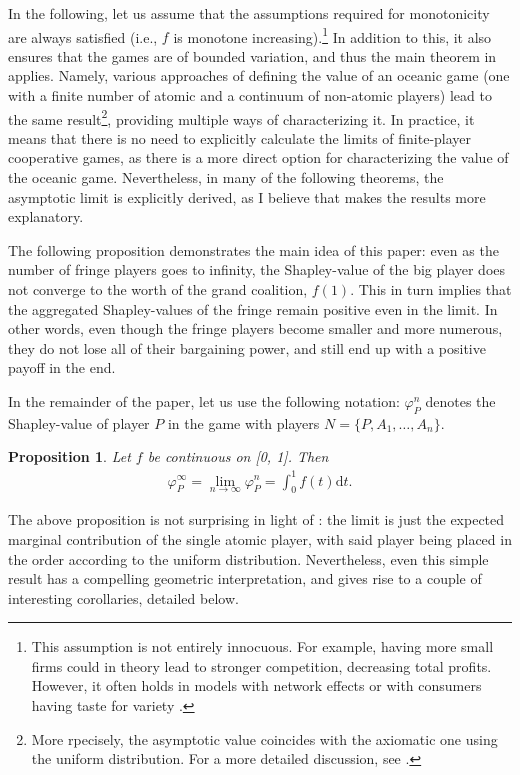 \documentclass[a4paper]{article}
\newtheorem{proposition}{Proposition}
\newcommand{\dt}{\mathrm{d}t}
\begin{document}
In the following, let us assume that the assumptions required for monotonicity are always satisfied (i.e., $f$ is monotone increasing).\footnote{
    This assumption is not entirely innocuous.
    For example, having more small firms could in theory lead to stronger competition, decreasing total profits.
    However, it often holds in models with network effects \parencite{rochet2003platform} or with consumers having taste for variety \parencite{anderson2020aggregative}.
}
In addition to this, it also ensures that the games are of bounded variation, and thus the main theorem in \textcite{fogelman1980asymptotic} applies.
Namely, various approaches of defining the value of an oceanic game (one with a finite number of atomic and a continuum of non-atomic players) lead to the same result\footnote{
    More rpecisely, the asymptotic value coincides with the axiomatic one using the uniform distribution.
    For a more detailed discussion, see \textcite{fogelman1980asymptotic}.
}, providing multiple ways of characterizing it.
In practice, it means that there is no need to explicitly calculate the limits of finite-player cooperative games, as there is a more direct option for characterizing the value of the oceanic game.
Nevertheless, in many of the following theorems, the asymptotic limit is explicitly derived, as I believe that makes the results more explanatory.

The following proposition demonstrates the main idea of this paper: even as the number of fringe players goes to infinity, the Shapley-value of the big player does not converge to the worth of the grand coalition, $f(1)$.
This in turn implies that the aggregated Shapley-values of the fringe remain positive even in the limit.
In other words, even though the fringe players become smaller and more numerous, they do not lose all of their bargaining power, and still end up with a positive payoff in the end.

In the remainder of the paper, let us use the following notation: $\varphi_P^n$ denotes the Shapley-value of player $P$ in the game with players $N = \{P, A_1, \dots, A_n\}$.
\begin{proposition}
    \label{prop:one_sided}
    Let $f$ be continuous on [0, 1]. Then
    \begin{align*}
        \varphi_P^\infty = \lim_{n \to \infty} \varphi_P^n = \int_0^1 f(t) \dt .
    \end{align*}
\end{proposition}

The above proposition is not surprising in light of \textcite{fogelman1980asymptotic}: the limit is just the expected marginal contribution of the single atomic player, with said player being placed in the order according to the uniform distribution.
Nevertheless, even this simple result has a compelling geometric interpretation, and gives rise to a couple of interesting corollaries, detailed below.
\end{document}
